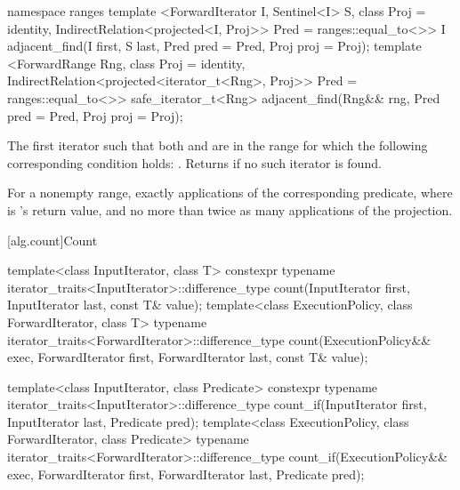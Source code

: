 \begin{addedblock}
%
\begin{itemdecl}
namespace ranges {
  template <ForwardIterator I, Sentinel<I> S, class Proj = identity,
            IndirectRelation<projected<I, Proj>> Pred = ranges::equal_to<>>
    I adjacent_find(I first, S last, Pred pred = Pred{}, Proj proj = Proj{});
  template <ForwardRange Rng, class Proj = identity,
            IndirectRelation<projected<iterator_t<Rng>, Proj>> Pred = ranges::equal_to<>>
    safe_iterator_t<Rng> adjacent_find(Rng&& rng, Pred pred = Pred{}, Proj proj = Proj{});
}
\end{itemdecl}

\begin{itemdescr}
\pnum
\returns
The first iterator
such that both
and
are in
the range
for which
the following corresponding condition holds:
.
Returns 
if no such iterator is found.

\pnum
\complexity
For a nonempty range, exactly
applications of the corresponding predicate, where  is
's
return value, and no more than twice as many applications of the projection.
\end{itemdescr}
\end{addedblock}

[alg.count]{Count}

%
%
\begin{itemdecl}
template<class InputIterator, class T>
  constexpr typename iterator_traits<InputIterator>::difference_type
    count(InputIterator first, InputIterator last, const T& value);
template<class ExecutionPolicy, class ForwardIterator, class T>
  typename iterator_traits<ForwardIterator>::difference_type
    count(ExecutionPolicy&& exec,
          ForwardIterator first, ForwardIterator last, const T& value);

template<class InputIterator, class Predicate>
  constexpr typename iterator_traits<InputIterator>::difference_type
    count_if(InputIterator first, InputIterator last, Predicate pred);
template<class ExecutionPolicy, class ForwardIterator, class Predicate>
  typename iterator_traits<ForwardIterator>::difference_type
    count_if(ExecutionPolicy&& exec,
             ForwardIterator first, ForwardIterator last, Predicate pred);
\end{itemdecl}

